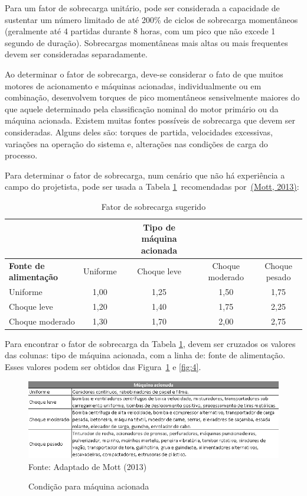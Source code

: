 \documentclass[12pt,a4paper]{article}
\begin{document}
Para um fator de sobrecarga unitário, pode ser considerada a capacidade
de sustentar um número limitado de até 200\% de ciclos de sobrecarga
momentâneos (geralmente até 4 partidas durante 8 horas, com um pico que
não excede 1 segundo de duração). Sobrecargas momentâneas mais altas ou
mais frequentes devem ser consideradas separadamente.

Ao determinar o fator de sobrecarga, deve-se considerar o fato de que
muitos motores de acionamento e máquinas acionadas, individualmente ou
em combinação, desenvolvem torques de pico momentâneos sensivelmente
maiores do que aquele determinado pela classificação nominal do motor
primário ou da máquina acionada. Existem muitas fontes possíveis de
sobrecarga que devem ser consideradas. Alguns deles são: torques de
partida, velocidades excessivas, variações na operação do sistema e,
alterações nas condições de carga do processo.

Para determinar o fator de sobrecarga, num cenário que não há
experiência a campo do projetista, pode ser usada a Tabela
{\ref{tab:1}}~recomendadas por~\hyperref[csl:21]{(Mott, 2013)}:

\begin{table}[htbp]
    \centering
    \caption{{\label{tab:1} Fator de sobrecarga sugerido}}
    \begin{tabular}{lcccc}
    \hline
&&\textbf{Tipo de máquina acionada} \\\hline
\textbf{Fonte de alimentação} &Uniforme &Choque leve &Choque moderado &Choque pesado\\\hline
Uniforme    &1,00 &1,25 &1,50 &1,75 \\\hline
Choque leve &1,20 &1,40 &1,75 &2,25 \\\hline
Choque moderado & 1,30 & 1,70  & 2,00  & 2,75 \\\hline
    \end{tabular}
\end{table}

Para encontrar o fator de sobrecarga da Tabela {\ref{tab:1}}, devem ser cruzados os valores das colunas: tipo de máquina acionada, com a linha de: fonte de alimentação. Esses valores podem ser obtidos das Figura~\ref{fig:3} e \ref{fig:4}.

\begin{figure}[!htb]
    \centering
    \caption{Condição para máquina acionada}
    \includegraphics[scale=0.8]{Imagens/Img3.png} \\
    {\footnotesize Fonte: Adaptado de Mott (2013)}
    \label{fig:3}
\end{figure}
\end{document}
